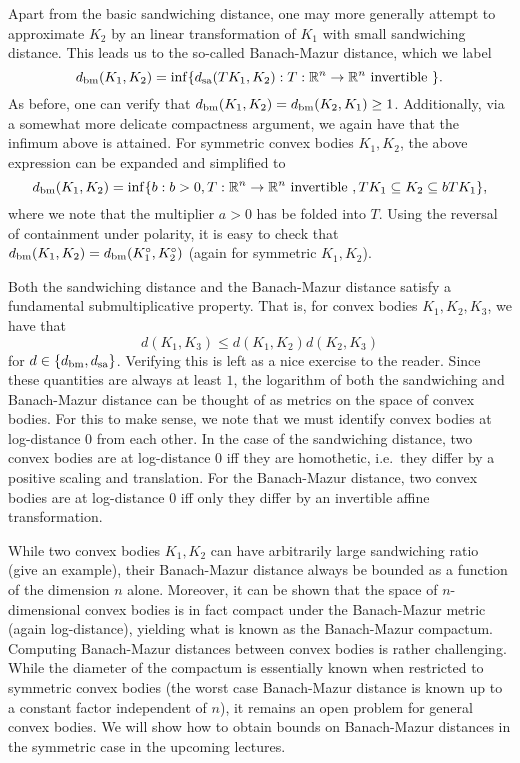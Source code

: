 \documentclass[11pt]{article}
\theoremstyle{plain}
\theoremstyle{plain}
\newcommand{\set}[1]{\{{#1}\}}
\newcommand{\R}{\ensuremath{\mathbb{R}}}
\begin{document}
Apart from the basic sandwiching distance, one may more generally attempt to
approximate $K_2$ by an linear transformation of $K_1$ with small sandwiching
distance. This leads us to the so-called Banach-Mazur distance, which we label
\begin{equation}
\label{eq:bm-dist}
d_{\rm bm}(K_1,K_2) = \inf \set{d_{\rm sa}(TK_1,K_2): T: \R^n \rightarrow \R^n \text{
invertible }}.
\end{equation}
As before, one can verify that $d_{\rm bm}(K_1,K_2) = d_{\rm bm}(K_2,K_1) \geq
1$. Additionally, via a somewhat more delicate compactness argument, we again
have that the infimum above is attained. For symmetric convex bodies $K_1,K_2$,
the above expression can be expanded and simplified to
\begin{equation}
\label{eq:bm-dist-sym}
d_{\rm bm}(K_1,K_2) = \inf \set{b: b > 0, T: \R^n \rightarrow \R^n \text{
invertible }, T K_1 \subseteq K_2 \subseteq b TK_1},
\end{equation}
where we note that the multiplier $a > 0$ has be folded into $T$. Using the
reversal of containment under polarity, it is easy to check that $d_{\rm
bm}(K_1,K_2) = d_{\rm bm}(K_1^\circ,K_2^\circ)$ (again for symmetric $K_1,K_2$). 

Both the sandwiching distance and the Banach-Mazur distance satisfy a
fundamental submultiplicative property. That is, for convex bodies
$K_1,K_2,K_3$, we have that 
\begin{equation}
\label{lem:subm-dist}
d(K_1,K_3) \leq d(K_1,K_2) d(K_2,K_3)
\end{equation}
for $d \in \set{d_{\rm bm},d_{\rm sa}}$. Verifying this is left as a nice
exercise to the reader. Since these quantities are always at least $1$, the
logarithm of both the sandwiching and Banach-Mazur distance can be thought of as
metrics on the space of convex bodies. For this to make sense, we note that we
must identify convex bodies at log-distance $0$ from each other. In the case of
the sandwiching distance, two convex bodies are at log-distance $0$ iff they are
homothetic, i.e.~they differ by a positive scaling and translation. For the
Banach-Mazur distance, two convex bodies are at log-distance $0$ iff only they
differ by an invertible affine transformation.

While two convex bodies $K_1,K_2$ can have arbitrarily large sandwiching ratio
(give an example), their Banach-Mazur distance always be bounded as a function
of the dimension $n$ alone. Moreover, it can be shown that the space of
$n$-dimensional convex bodies is in fact compact under the Banach-Mazur metric
(again log-distance), yielding what is known as the Banach-Mazur compactum.
Computing Banach-Mazur distances between convex bodies is rather challenging.
While the diameter of the compactum is essentially known when restricted to
symmetric convex bodies (the worst case Banach-Mazur distance is known up to a
constant factor independent of $n$), it remains an open problem for general
convex bodies. We will show how to obtain bounds on Banach-Mazur distances in
the symmetric case in the upcoming lectures.
\end{document}

